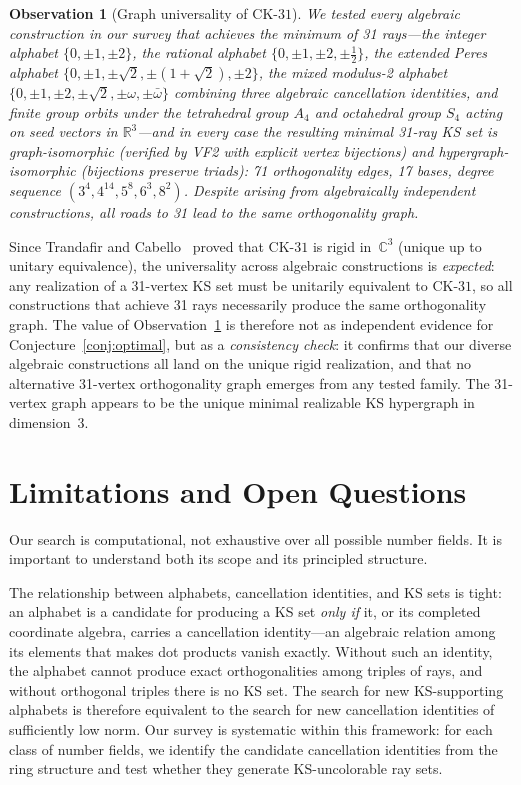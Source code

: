 \documentclass[12pt,a4paper]{article}
\newtheorem{observation}[theorem]{Observation}
\newcommand{\R}{\mathbb{R}}
\newcommand{\C}{\mathbb{C}}
\newcommand{\CK}{\mathrm{CK}\text{-}31}
\begin{document}
\begin{observation}[Graph universality of $\CK$]\label{obs:universality}
We tested every algebraic construction in our survey that achieves the minimum of 31 rays---the integer alphabet $\{0,\pm 1,\pm 2\}$, the rational alphabet $\{0,\pm 1,\pm 2,\pm\tfrac{1}{2}\}$, the extended Peres alphabet $\{0,\pm 1,\pm\sqrt{2},\pm(1+\sqrt{2}),\pm 2\}$, the mixed modulus-2 alphabet $\{0,\pm 1,\pm 2,\pm\sqrt{2},\pm\omega,\pm\bar\omega\}$ combining three algebraic cancellation identities, and finite group orbits under the tetrahedral group $A_4$ and octahedral group $S_4$ acting on seed vectors in $\R^3$---and in every case the resulting minimal 31-ray KS set is graph-isomorphic (verified by VF2 with explicit vertex bijections) and hypergraph-isomorphic (bijections preserve triads): 71 orthogonality edges, 17 bases, degree sequence $(3^4, 4^{14}, 5^8, 6^3, 8^2)$. Despite arising from algebraically independent constructions, all roads to 31 lead to the same orthogonality graph.
\end{observation}

Since Trandafir and Cabello~\cite{TrandafirCabello2025} proved that $\CK$ is rigid in~$\C^3$ (unique up to unitary equivalence), the universality across algebraic constructions is \emph{expected}: any realization of a 31-vertex KS set must be unitarily equivalent to $\CK$, so all constructions that achieve 31 rays necessarily produce the same orthogonality graph.  The value of Observation~\ref{obs:universality} is therefore not as independent evidence for Conjecture~\ref{conj:optimal}, but as a \emph{consistency check}: it confirms that our diverse algebraic constructions all land on the unique rigid realization, and that no alternative 31-vertex orthogonality graph emerges from any tested family.  The 31-vertex graph appears to be the unique minimal realizable KS hypergraph in dimension~3.

\section{Limitations and Open Questions}\label{sec:limitations}

Our search is computational, not exhaustive over all possible number fields.  It is important to understand both its scope and its principled structure.

The relationship between alphabets, cancellation identities, and KS sets is tight: an alphabet is a candidate for producing a KS set \emph{only if} it, or its completed coordinate algebra, carries a cancellation identity---an algebraic relation among its elements that makes dot products vanish exactly.  Without such an identity, the alphabet cannot produce exact orthogonalities among triples of rays, and without orthogonal triples there is no KS set.  The search for new KS-supporting alphabets is therefore equivalent to the search for new cancellation identities of sufficiently low norm.  Our survey is systematic within this framework: for each class of number fields, we identify the candidate cancellation identities from the ring structure and test whether they generate KS-uncolorable ray sets.
\end{document}
